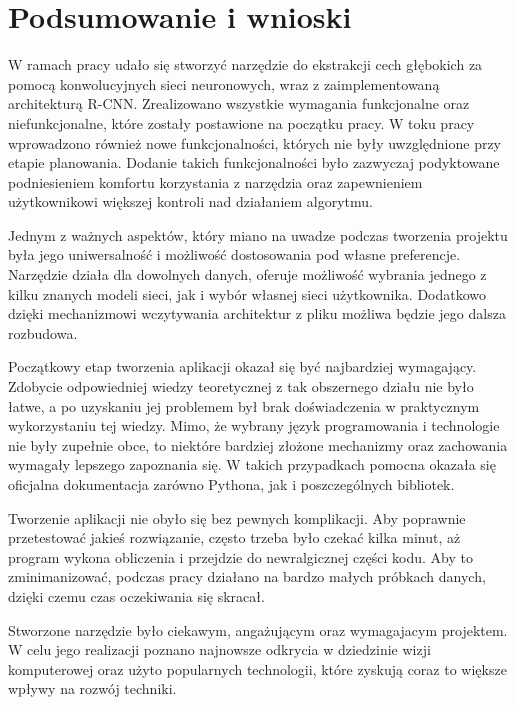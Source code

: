 \documentclass[a4paper,twoside,12pt]{book}
\newcounter{stronyPozaNumeracja}
\begin{document}
{\chapter{Podsumowanie i wnioski}
{W ramach pracy udało się stworzyć narzędzie do ekstrakcji cech głębokich za pomocą konwolucyjnych sieci neuronowych, wraz z zaimplementowaną architekturą R-CNN. Zrealizowano wszystkie wymagania funkcjonalne oraz niefunkcjonalne, które zostały postawione na początku pracy. W toku pracy wprowadzono również nowe funkcjonalności, których nie były uwzględnione przy etapie planowania. Dodanie takich funkcjonalności było zazwyczaj podyktowane podniesieniem komfortu korzystania z narzędzia oraz zapewnieniem użytkownikowi większej kontroli nad działaniem algorytmu.}

{Jednym z ważnych aspektów, który miano na uwadze podczas tworzenia projektu była jego uniwersalność i możliwość dostosowania pod własne preferencje. Narzędzie działa dla dowolnych danych, oferuje możliwość wybrania jednego z kilku znanych modeli sieci, jak i wybór własnej sieci użytkownika. Dodatkowo dzięki mechanizmowi wczytywania architektur z pliku możliwa będzie jego dalsza rozbudowa.}

{Początkowy etap tworzenia aplikacji okazał się być najbardziej wymagający. Zdobycie odpowiedniej wiedzy teoretycznej z tak obszernego działu nie było łatwe, a po uzyskaniu jej problemem był brak doświadczenia w praktycznym wykorzystaniu tej wiedzy. Mimo, że wybrany język programowania i technologie nie były zupełnie obce, to niektóre bardziej złożone mechanizmy oraz zachowania wymagały lepszego zapoznania się. W takich przypadkach pomocna okazała się oficjalna dokumentacja zarówno Pythona, jak i poszczególnych bibliotek.}

{Tworzenie aplikacji nie obyło się bez pewnych komplikacji. Aby poprawnie przetestować jakieś rozwiązanie, często trzeba było czekać kilka minut, aż program wykona obliczenia i przejdzie do newralgicznej części kodu. Aby to zminimanizować, podczas pracy działano na bardzo małych próbkach danych, dzięki czemu czas oczekiwania się skracał.}

{Stworzone narzędzie było ciekawym, angażującym oraz wymagajacym projektem. W celu jego realizacji poznano najnowsze odkrycia w dziedzinie wizji komputerowej oraz użyto popularnych technologii, które zyskują coraz to większe wpływy na rozwój techniki.}



 
 

\backmatter 
{}
\setcounter{page}{\value{stronyPozaNumeracja}}
\pagestyle{tylkoNumeryStron}
 
}
\end{document}
